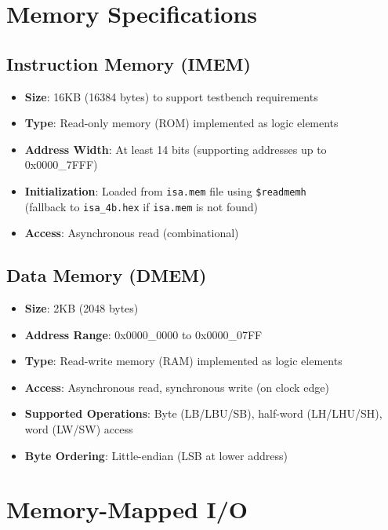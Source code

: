 \section{Memory Specifications}

\subsection{Instruction Memory (IMEM)}

\begin{itemize}
    \item \textbf{Size}: 16KB (16384 bytes) to support testbench requirements
    \item \textbf{Type}: Read-only memory (ROM) implemented as logic elements
    \item \textbf{Address Width}: At least 14 bits (supporting addresses up to 0x0000\_7FFF)
    \item \textbf{Initialization}: Loaded from \texttt{isa.mem} file using \texttt{\$readmemh}\\ (fallback to \texttt{isa\_4b.hex} if \texttt{isa.mem} is not found)
    \item \textbf{Access}: Asynchronous read (combinational)
\end{itemize}

\subsection{Data Memory (DMEM)}

\begin{itemize}
    \item \textbf{Size}: 2KB (2048 bytes)
    \item \textbf{Address Range}: 0x0000\_0000 to 0x0000\_07FF
    \item \textbf{Type}: Read-write memory (RAM) implemented as logic elements
    \item \textbf{Access}: Asynchronous read, synchronous write (on clock edge)
    \item \textbf{Supported Operations}: Byte (LB/LBU/SB), half-word (LH/LHU/SH), word (LW/SW) access
    \item \textbf{Byte Ordering}: Little-endian (LSB at lower address)
\end{itemize}

\section{Memory-Mapped I/O}

